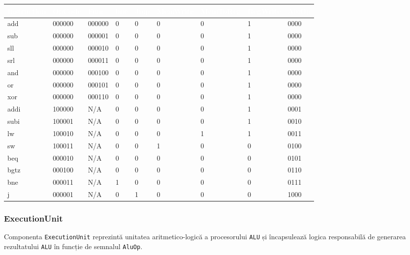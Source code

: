 \documentclass{article}
\begin{document}
\begin{tcolorbox}[colback=white!5!white,colframe=violet!75!black,title=Maparea semnalelor de control]
\begin{tabularx}{\linewidth}{ |l|l|l|l|l|X|X|X|l|}
\rowcolor{violet!75!black} \textcolor{white}{Instruction}  & \textcolor{white}{OpCode} & \textcolor{white}{Func} & \textcolor{white}{bne} & \textcolor{white}{Jmp} & \textcolor{white}{MemWrite} & \textcolor{white}{MemToReg} & \textcolor{white}{RegWrite} & \textcolor{white}{AluOp} \\
\hline
\rowcolor{violet!20!white} add & 000000 & 000000 & 0 & 0 & 0 & 0 & 1 & 0000 \\
\hline
sub & 000000 & 000001 & 0 & 0 & 0 & 0 & 1 & 0000 \\
\hline
\rowcolor{violet!20!white} sll & 000000 & 000010 & 0 & 0 & 0 & 0 & 1 & 0000 \\
\hline
srl & 000000 & 000011 & 0 & 0 & 0 & 0 & 1 & 0000 \\
\hline
\rowcolor{violet!20!white} and & 000000 & 000100 & 0 & 0 & 0 & 0 & 1 & 0000 \\
\hline
or & 000000 & 000101 & 0 & 0 & 0 & 0 & 1 & 0000 \\
\hline
\rowcolor{violet!20!white} xor & 000000 & 000110 & 0 & 0 & 0 & 0 & 1 & 0000 \\
\hline
addi & 100000 & N/A & 0 & 0 & 0 & 0 & 1 & 0001 \\
\hline
\rowcolor{violet!20!white} subi & 100001 & N/A & 0 & 0 & 0 & 0 & 1 & 0010 \\
\hline
lw & 100010 & N/A & 0 & 0 & 0 & 1 & 1 & 0011 \\
\hline
\rowcolor{violet!20!white} sw & 100011 & N/A & 0 & 0 & 1 & 0 & 0 & 0100 \\
\hline
beq & 000010 & N/A & 0 & 0 & 0 & 0 & 0 & 0101 \\
\hline
\rowcolor{violet!20!white} bgtz & 000100 & N/A & 0 & 0 & 0 & 0 & 0 & 0110 \\
\hline
bne & 000011 & N/A & 1 & 0 & 0 & 0 & 0 & 0111 \\
\hline
\rowcolor{violet!20!white} j & 000001 & N/A & 0 & 1 & 0 & 0 & 0 &1000 \\
\hline
\end{tabularx}
\end{tcolorbox}

\subsubsection{ExecutionUnit}
Componenta \texttt{ExecutionUnit} reprezintă unitatea aritmetico-logică a procesorului \texttt{ALU} și încapsulează logica responsabilă de generarea rezultatului \texttt{ALU} în funcție de semnalul \texttt{AluOp}.
\end{document}
